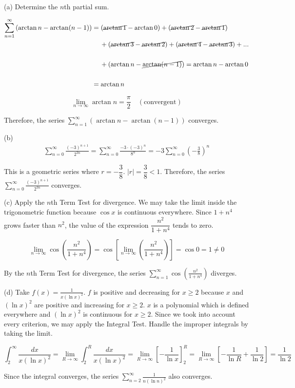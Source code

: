 \documentclass{article}
\begin{document}
\hfill

\noindent (a) Determine the $n$th partial sum.

\begin{align*}\sum_{n=1}^{\infty}\left(\arctan n -\arctan(n-1)\right)&=\left(\cancel{\arctan1}-\arctan0\right)+\left(\cancel{\arctan2}-\cancel{\arctan1}\right)\\&\quad\:+\left(\cancel{\arctan3}-\cancel{\arctan2}\right)+\left(\cancel{\arctan4}-\cancel{\arctan3}\right)+...\\\\&\quad\:+\left(\arctan n-\cancel{\arctan(n-1)}\right)=\arctan n-\arctan0\\\\&=\arctan n\end{align*}

\[\lim_{n\to\infty}\arctan n=\frac\pi2\quad(\text{convergent})\]

\hfill

\noindent Therefore, the series $\displaystyle\sum_{n=1}^{\infty}\left(\arctan n -\arctan(n-1)\right)$ converges.

\hfill

\noindent (b)
\begin{align*}\sum_{n=0}^{\infty}\frac{(-3)^{n+1}}{2^{3n}}=\sum_{n=0}^{\infty}\frac{-3\cdot(-3)^n}{8^n}=-3\sum_{n=0}^{\infty}\left(-\frac38\right)^n\end{align*}

\hfill

\noindent This is a geometric series where $r=-\dfrac38$. $|r|=\dfrac38<1$. Therefore, the series $\displaystyle\sum_{n=0}^{\infty}\frac{(-3)^{n+1}}{2^{3n}}$ converges.

\hfill

\noindent (c) Apply the $n$th Term Test for divergence. We may take the limit inside the trigonometric function because $\cos x$ is continuous everywhere. Since $1+n^4$ grows faster than $n^2$, the value of the expression $\dfrac{n^2}{1+n^4}$ tends to zero.

\[\lim_{n\to\infty}\cos\left(\frac{n^2}{1+n^4}\right)=\cos\left[\lim_{n\to\infty}\left(\frac{n^2}{1+n^4}\right)\right]=\cos0=1\neq0\]

\hfill

\noindent By the $n$th Term Test for divergence, the series $\displaystyle\sum_{n=1}^\infty\cos\left(\frac{n^2}{1+n^4}\right)$ diverges.

\hfill

\noindent (d) Take $\displaystyle f(x)=\frac1{x(\ln x)^2}$. $f$ is positive and decreasing for $x\geq2$ because $x$ and $(\ln x)^2$ are positive and increasing for $x\geq2$. $x$ is a polynomial which is defined everywhere and $(\ln x)^2$ is continuous for $x\geq2$. Since we took into account every criterion, we may apply the Integral Test. Handle the improper integrals by taking the limit.

\[\int_2^{\infty}\frac{dx}{x(\ln x)^2}=\lim_{R\to\infty}\int_2^R\frac{dx}{x(\ln x)^2}=\lim_{R\to\infty}\left[-\frac1{\ln x}\right]_2^R=\lim_{R\to\infty}\left[-\frac1{\ln R}+\frac1{\ln2}\right]=\frac1{\ln 2}\]

\hfill

\noindent Since the integral converges, the series $\displaystyle\sum_{n=2}^\infty\frac1{n(\ln n)^2}$ also converges.
\end{document}
